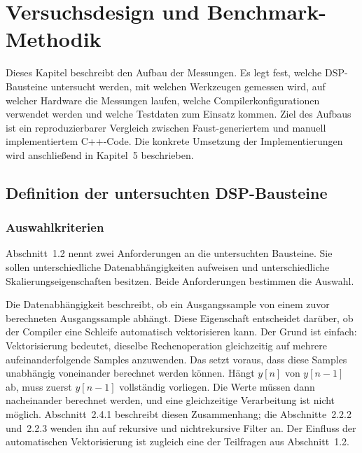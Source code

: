 %

\chapter{Versuchsdesign und Benchmark-Methodik}

Dieses Kapitel beschreibt den Aufbau der Messungen. Es legt fest, welche
DSP-Bausteine untersucht werden, mit welchen Werkzeugen gemessen wird, auf
welcher Hardware die Messungen laufen, welche Compilerkonfigurationen
verwendet werden und welche Testdaten zum Einsatz kommen. Ziel des Aufbaus
ist ein reproduzierbarer Vergleich zwischen Faust-generiertem und manuell
implementiertem C++-Code. Die konkrete Umsetzung der Implementierungen wird
anschließend in Kapitel~5 beschrieben.


\section{Definition der untersuchten DSP-Bausteine}
\label{sec:bausteine}

\subsection{Auswahlkriterien}

Abschnitt~1.2 nennt zwei Anforderungen an die untersuchten Bausteine. Sie
sollen unterschiedliche Datenabhängigkeiten aufweisen und unterschiedliche
Skalierungseigenschaften besitzen. Beide Anforderungen bestimmen die Auswahl.

Die Datenabhängigkeit beschreibt, ob ein Ausgangssample von einem zuvor
berechneten Ausgangssample abhängt. Diese Eigenschaft entscheidet darüber, ob
der Compiler eine Schleife automatisch vektorisieren kann. Der Grund ist
einfach: Vektorisierung bedeutet, dieselbe Rechenoperation gleichzeitig auf
mehrere aufeinanderfolgende Samples anzuwenden. Das setzt voraus, dass diese
Samples unabhängig voneinander berechnet werden können. Hängt $y[n]$ von
$y[n-1]$ ab, muss zuerst $y[n-1]$ vollständig vorliegen. Die Werte müssen
dann nacheinander berechnet werden, und eine gleichzeitige Verarbeitung ist
nicht möglich. Abschnitt~2.4.1 beschreibt diesen Zusammenhang; die
Abschnitte~2.2.2 und~2.2.3 wenden ihn auf rekursive und nichtrekursive
Filter an. Der Einfluss der automatischen Vektorisierung ist zugleich eine
der Teilfragen aus Abschnitt~1.2.

